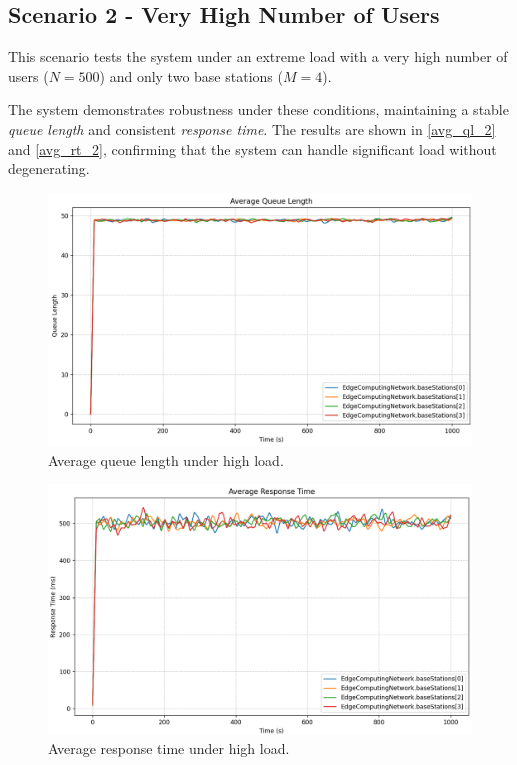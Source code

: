 \documentclass{report}
\begin{document}
\subsection{Scenario 2 - Very High Number of Users}
This scenario tests the system under an extreme load with a very high number of users ($N = 500$) and only two base stations ($M = 4$). 

The system demonstrates robustness under these conditions, maintaining a stable \textit{queue length} and consistent \textit{response time}. The results are shown in \autoref{avg_ql_2} and \autoref{avg_rt_2}, confirming that the system can handle significant load without degenerating.

\begin{figure}[H]
    \centering
    \includegraphics[width=1\textwidth]{img/avg_ql_2.png}
    \caption{Average queue length under high load.}
    \label{avg_ql_2}
\end{figure}

\begin{figure}[H]
    \centering
    \includegraphics[width=1\textwidth]{img/avg_rt_2.png}
    \caption{Average response time under high load.}
    \label{avg_rt_2}
\end{figure}
\end{document}
